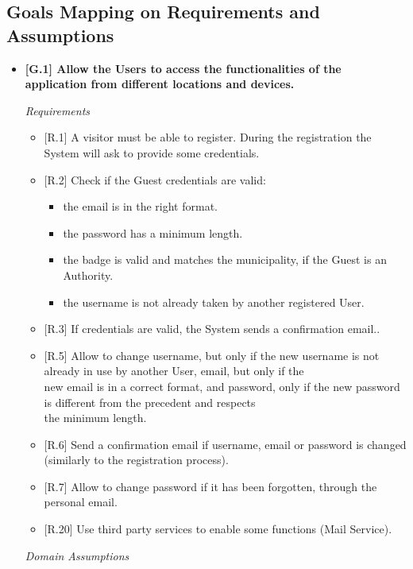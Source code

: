 \documentclass{report}
\begin{document}
\subsection{Goals Mapping on Requirements and Assumptions}
\begin{itemize}
	\item \textbf{{[G.1]} Allow the Users to access the functionalities of the application from different locations and devices.}
\begin{center}\large{\textit{Requirements}}\end{center}
	\begin{itemize}
		\item{[R.1]} 
		A visitor must be able to register. During the registration the System will ask to provide some credentials.
		\item {[R.2]} Check if the Guest credentials are valid:
	        \begin{itemize}
	            \item the email is in the right format.
	            \item the password has a minimum length.
	            \item the badge is valid and matches the municipality, if the Guest is an Authority.
	            \item the username is not already taken by another registered User.
	        \end{itemize}
		\item {[R.3]} If credentials are valid, the System sends a confirmation email..
		\item {[R.5]} 
		Allow to change username, but only if the new username is not already in use by another User, email, but only if the\\
		new email is in a correct format, and password, only if the new password is different from the precedent and respects \\ 
		the minimum length.
		\item {[R.6]} Send a confirmation email if username, email or password is changed (similarly to the registration process).
		\item {[R.7]} 
		Allow to change password if it has been forgotten, through the personal email.
		\item {[R.20]} Use third party services to enable some functions (Mail Service).
	\end{itemize}
\begin{center}\large{\textit{Domain Assumptions}}\end{center}

\end{itemize}
\end{document}
